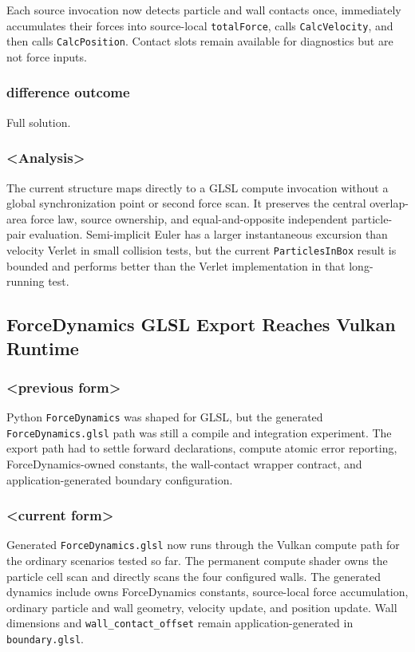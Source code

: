 Each source invocation now detects particle and wall contacts once,
immediately accumulates their forces into source-local \texttt{totalForce},
calls \texttt{CalcVelocity}, and then calls \texttt{CalcPosition}.  Contact
slots remain available for diagnostics but are not force inputs.

\subsubsection{difference outcome}

Full solution.

\subsubsection{<Analysis>}

The current structure maps directly to a GLSL compute invocation without a
global synchronization point or second force scan.  It preserves the central
overlap-area force law, source ownership, and equal-and-opposite independent
particle-pair evaluation.  Semi-implicit Euler has a larger instantaneous
excursion than velocity Verlet in small collision tests, but the current
\texttt{ParticlesInBox} result is bounded and performs better than the Verlet
implementation in that long-running test.

\subsection{ForceDynamics GLSL Export Reaches Vulkan Runtime}

\subsubsection{<previous form>}

Python \texttt{ForceDynamics} was shaped for GLSL, but the generated
\texttt{ForceDynamics.glsl} path was still a compile and integration
experiment.  The export path had to settle forward declarations, compute
atomic error reporting, ForceDynamics-owned constants, the wall-contact
wrapper contract, and application-generated boundary configuration.

\subsubsection{<current form>}

Generated \texttt{ForceDynamics.glsl} now runs through the Vulkan compute path
for the ordinary scenarios tested so far.  The permanent compute shader owns
the particle cell scan and directly scans the four configured walls.  The
generated dynamics include owns ForceDynamics constants, source-local force
accumulation, ordinary particle and wall geometry, velocity update, and
position update.  Wall dimensions and \texttt{wall\_contact\_offset} remain
application-generated in \texttt{boundary.glsl}.

